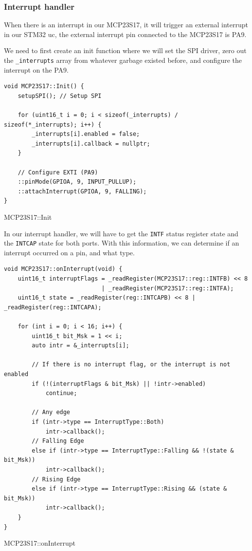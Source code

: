 \documentclass{article}
\begin{document}
\subsubsection{Interrupt handler}

When there is an interrupt in our MCP23S17, it will trigger an external interrupt in our STM32 uc, the external interrupt pin connected to the MCP23S17 is PA9.

We need to first create an init function where we will set the SPI driver, zero out the \verb|_interrupts| array from whatever garbage existed before, and configure the interrupt on the PA9.

\begin{listing}[H]
\begin{verbatim}
void MCP23S17::Init() {
    setupSPI(); // Setup SPI

    for (uint16_t i = 0; i < sizeof(_interrupts) / sizeof(*_interrupts); i++) {
        _interrupts[i].enabled = false;
        _interrupts[i].callback = nullptr;
    }

    // Configure EXTI (PA9)
    ::pinMode(GPIOA, 9, INPUT_PULLUP);
    ::attachInterrupt(GPIOA, 9, FALLING);
}
\end{verbatim}
\caption{MCP23S17::Init}
\end{listing}

In our interrupt handler, we will have to get the \verb|INTF| status register state and the \verb|INTCAP| state for both ports. With this information, we can determine if an interrupt occurred on a pin, and what type.
\begin{listing}[H]
\begin{verbatim}
void MCP23S17::onInterrupt(void) {
    uint16_t interruptFlags = _readRegister(MCP23S17::reg::INTFB) << 8 
                            | _readRegister(MCP23S17::reg::INTFA);
    uint16_t state = _readRegister(reg::INTCAPB) << 8 | _readRegister(reg::INTCAPA);

    for (int i = 0; i < 16; i++) {
        uint16_t bit_Msk = 1 << i;
        auto intr = &_interrupts[i];

        // If there is no interrupt flag, or the interrupt is not enabled
        if (!(interruptFlags & bit_Msk) || !intr->enabled)
            continue;

        // Any edge
        if (intr->type == InterruptType::Both)
            intr->callback();
        // Falling Edge
        else if (intr->type == InterruptType::Falling && !(state & bit_Msk))
            intr->callback();
        // Rising Edge
        else if (intr->type == InterruptType::Rising && (state & bit_Msk))
            intr->callback();
    }
}
\end{verbatim}
\caption{MCP23S17::onInterrupt}
\end{listing}
\end{document}
